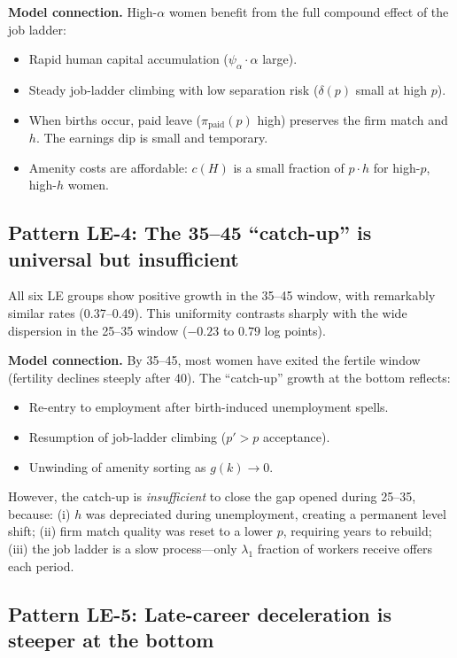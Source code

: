 \documentclass[11pt]{article}
\begin{document}
\medskip\noindent\textbf{Model connection.} High-$\alpha$ women benefit from the full compound effect of the job ladder:
\begin{itemize}[nosep]
  \item Rapid human capital accumulation ($\psi_\alpha \cdot \alpha$ large).
  \item Steady job-ladder climbing with low separation risk ($\delta(p)$ small at high $p$).
  \item When births occur, paid leave ($\pi_{\text{paid}}(p)$ high) preserves the firm match and $h$. The earnings dip is small and temporary.
  \item Amenity costs are affordable: $c(H)$ is a small fraction of $p \cdot h$ for high-$p$, high-$h$ women.
\end{itemize}

\subsection{Pattern LE-4: The 35--45 ``catch-up'' is universal but insufficient}

All six LE groups show positive growth in the 35--45 window, with remarkably similar rates (0.37--0.49). This uniformity contrasts sharply with the wide dispersion in the 25--35 window ($-0.23$ to $0.79$ log points).

\medskip\noindent\textbf{Model connection.} By 35--45, most women have exited the fertile window (fertility declines steeply after 40). The ``catch-up'' growth at the bottom reflects:
\begin{itemize}[nosep]
  \item Re-entry to employment after birth-induced unemployment spells.
  \item Resumption of job-ladder climbing ($p' > p$ acceptance).
  \item Unwinding of amenity sorting as $g(k) \to 0$.
\end{itemize}
However, the catch-up is \emph{insufficient} to close the gap opened during 25--35, because: (i) $h$ was depreciated during unemployment, creating a permanent level shift; (ii) firm match quality was reset to a lower $p$, requiring years to rebuild; (iii) the job ladder is a slow process---only $\lambda_1$ fraction of workers receive offers each period.

\subsection{Pattern LE-5: Late-career deceleration is steeper at the bottom}
\end{document}
